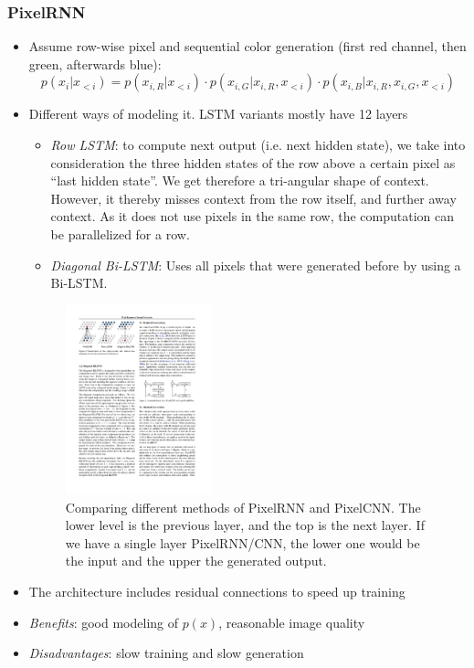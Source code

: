 \subsubsection{PixelRNN}
\begin{itemize}
	\item Assume row-wise pixel and sequential color generation (first red channel, then green, afterwards blue):
	$$p(x_i|x_{<i}) = p(x_{i,R}|x_{<i})\cdot p(x_{i,G}|x_{i,R}, x_{<i})\cdot p(x_{i,B}|x_{i,R}, x_{i,G}, x_{<i})$$
	\item Different ways of modeling it. LSTM variants mostly have 12 layers
	\begin{itemize}
		\item \textit{Row LSTM}: to compute next output (i.e. next hidden state), we take into consideration the three hidden states of the row above a certain pixel as ``last hidden state''. We get therefore a tri-angular shape of context. However, it thereby misses context from the row itself, and further away context. As it does not use pixels in the same row, the computation can be parallelized for a row. 
		\item \textit{Diagonal Bi-LSTM}: Uses all pixels that were generated before by using a Bi-LSTM. 
	\end{itemize}
	\begin{figure}[ht!]
		\centering
		\includegraphics[width=0.4\textwidth]{figures/Autoregressive_PixelRNN.pdf}
		\caption{Comparing different methods of PixelRNN and PixelCNN. The lower level is the previous layer, and the top is the next layer. If we have a single layer PixelRNN/CNN, the lower one would be the input and the upper the generated output.}
		\label{fig:Autoregressive_PixelRNN}
	\end{figure}
	\item The architecture includes residual connections to speed up training
	\item \textit{Benefits}: good modeling of $p(x)$, reasonable image quality
	\item \textit{Disadvantages}: slow training and slow generation
\end{itemize}
